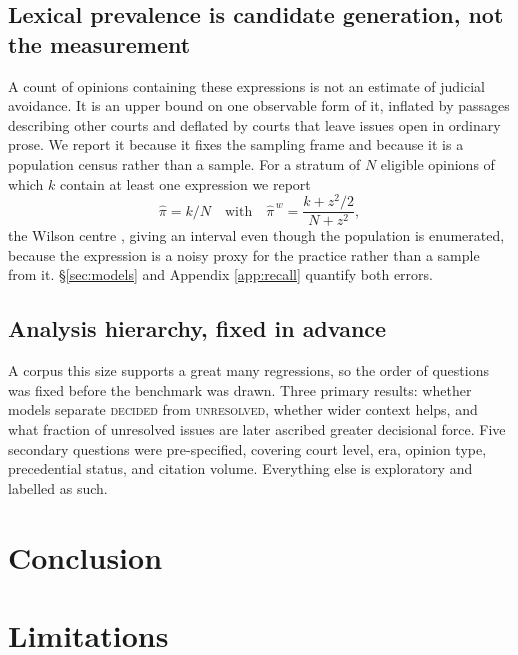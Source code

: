 \documentclass[11pt]{article}
\begin{document}
\subsection{Lexical prevalence is candidate generation, not the measurement} A
count of opinions containing these expressions is not an estimate of judicial
avoidance. It is an upper bound on one observable form of it, inflated by
passages describing other courts and deflated by courts that leave issues open in
ordinary prose. We report it because it fixes the sampling frame and because it
is a population census rather than a sample. For a stratum of $N$ eligible
opinions of which $k$ contain at least one expression we report
\begin{equation}
\hat{\pi}=k/N \quad\text{with}\quad
\hat{\pi}^{\,w}=\frac{k+z^{2}/2}{N+z^{2}},
\end{equation}
the Wilson centre \citep{wilson1927probable}, giving an interval even though the
population is enumerated, because the expression is a noisy proxy for the
practice rather than a sample from it. \S\ref{sec:models} and Appendix
\ref{app:recall} quantify both errors.

\subsection{Analysis hierarchy, fixed in advance} A corpus this size supports a
great many regressions, so the order of questions was fixed before the benchmark
was drawn. Three primary results: whether models separate \textsc{decided} from
\textsc{unresolved}, whether wider context helps, and what fraction of
unresolved issues are later ascribed greater decisional force. Five secondary
questions were pre-specified, covering court level, era, opinion type,
precedential status, and citation volume. Everything else is exploratory and
labelled as such.



\section{Conclusion}
\label{sec:conclusion}


\clearpage

\section*{Limitations}
\end{document}
